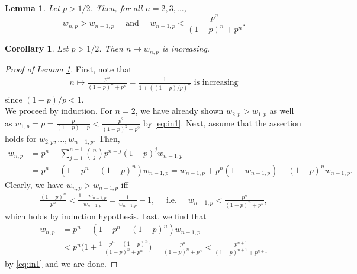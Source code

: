 \documentclass{article}
\newtheorem{lemma}[proposition]{Lemma}
\newtheorem{corollary}[proposition]{Corollary}
\theoremstyle{definition}
\theoremstyle{step} \newtheorem{step}{Step}
\begin{document}
\begin{lemma}\label{l1}
  Let $p>1/2$. Then, for all $n=2,3,...$,
  $$ w_{n,p} > w_{n-1,p} \quad \text{ and } \quad w_{n-1,p} <
  \frac{p^n}{(1-p)^n + p^n}.$$
\end{lemma}

\begin{corollary}
  Let $p>1/2$. Then $n\mapsto w_{n,p}$ is increasing.
\end{corollary}

\begin{proof}[Proof of Lemma \ref{l1}]
  First, note that
  \begin{align}\label{eq:in1}
    n \mapsto \frac{p^n}{(1-p)^n + p^n} = \frac{1}{1 + ((1-p)/p)^n}
    \text{ is increasing}
  \end{align}
  since $(1-p)/p < 1$. \\ We proceed by induction. For $n=2$, we have
  already shown $w_{2,p} > w_{1,p}$ as well as $w_{1,p} = p =
  \frac{p}{(1-p) + p} < \frac{p^2}{(1-p)^2 + p^2}$ by
  \eqref{eq:in1}. Next, assume that the assertion holds for
  $w_{2,p},...,w_{n-1,p}$. Then,
  \begin{align*}
    w_{n,p} & = p^n + \sum_{j=1}^{n-1} \binom n j p^{n-j} (1-p)^j
    w_{n-1,p} \\ & = p^n + (1 - p^n - (1-p)^n)w_{n-1,p} = w_{n-1,p} +
    p^n(1 - w_{n-1,p}) - (1-p)^n w_{n-1,p}.
  \end{align*}
  Clearly, we have $w_{n,p} > w_{n-1,p}$ iff
  \begin{align*}
    \frac{(1-p)^n}{p^n} < \frac{1 - w_{n-1,p}}{w_{n-1,p}} =
    \frac{1}{w_{n-1,p}} - 1, \quad \text{ i.e. } \quad w_{n-1,p} <
    \frac{p^n}{(1-p)^n + p^n},
  \end{align*}
  which holds by induction hypothesis. Last, we find that
  \begin{align*}
    w_{n,p} & = p^n + (1 - p^n - (1-p)^n)w_{n-1,p} \\ & < p^n\Big(1 +
    \frac{1-p^n - (1-p)^n}{(1-p)^n + p^n}\Big) = \frac{p^n}{(1-p)^n +
      p^n} < \frac{p^{n+1}}{(1-p)^{n+1} + p^{n+1}}
  \end{align*}
  by \eqref{eq:in1} and we are done.

\end{proof}

\newpage
\end{document}
